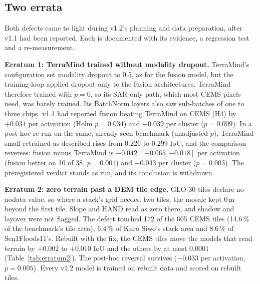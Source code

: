 \documentclass[10pt,twocolumn,a4paper]{article}
\newcommand{\pp}{\,\%}
\begin{document}
\subsection{Two errata}\label{sec:errata}
Both defects came to light during v1.2's planning and data preparation, after v1.1 had been reported. Each is
documented with its evidence, a regression test and a re-measurement.

\textbf{Erratum 1: TerraMind trained without modality dropout.} TerraMind's configuration set modality dropout to
0.5, as for the fusion model, but the training loop applied dropout only to the fusion architectures. TerraMind therefore
trained with $p=0$, so its SAR-only path, which most CEMS pixels need, was barely trained. Its BatchNorm layers also
saw sub-batches of one to three chips. v1.1 had reported fusion beating TerraMind on CEMS (H4) by $+0.031$ per
activation (Holm $p=0.034$) and $+0.039$ per cluster ($p=0.009$). In a post-hoc re-run on the same, already seen
benchmark (unadjusted $p$), TerraMind-small retrained as described rises from 0.226 to 0.299 IoU, and the comparison
reverses: fusion minus TerraMind is $-0.042$ $[-0.065, -0.018]$ per
activation (fusion better on 10 of 38, $p=0.001$) and $-0.043$ per cluster ($p=0.003$). The preregistered verdict
stands as run, and its conclusion is withdrawn.

\textbf{Erratum 2: zero terrain past a DEM tile edge.} GLO-30 tiles declare no nodata value, so where a stack's grid
needed two tiles, the mosaic kept 0\,m beyond the first tile. Slope and HAND read as zero there, and shadow and layover
were not flagged. The defect touched 172 of the 605 CEMS tiles (14.6\pp{} of the benchmark's tile area), 6.4\pp{}
of Kuro Siwo's stack area and 8.6\pp{} of Sen1Floods11's. Rebuilt with the fix, the CEMS tiles move the models that read terrain by
$+0.002$ to $+0.010$ IoU and the others by at most $0.0001$ (Table~\ref{tab:erratum2}). The post-hoc reversal
survives ($-0.033$ per activation, $p=0.005$). Every v1.2 model is trained on rebuilt data and scored on rebuilt tiles.
\end{document}
